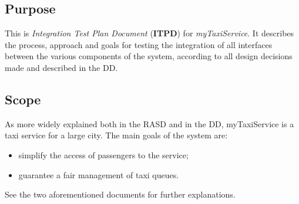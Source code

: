 \subsection{Purpose}
	This is \textit{Integration Test Plan Document} (\textbf{ITPD}) for \textit{myTaxiService}. It describes the process, approach and goals for testing the integration of all interfaces between the various components of the system, according to all design decisions made and described in the DD.

\subsection{Scope}
	As more widely explained both in the RASD and in the DD, myTaxiService
	is a taxi service for a large city. The main goals of the system
	are:
	\begin{itemize}
		\item simplify the access of passengers to the service;
		\item guarantee a fair management of taxi queues.
	\end{itemize}
	See the two aforementioned documents for further explanations.
